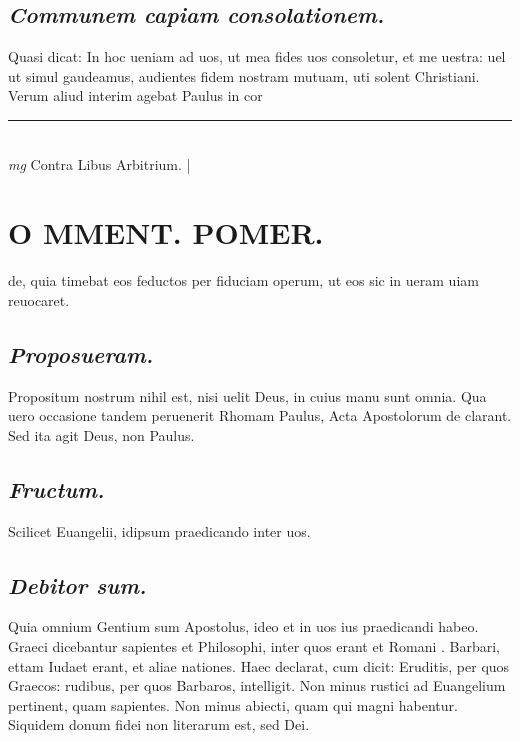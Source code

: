 \documentclass{article}
\begin{document}
\begin{pages}
\subsection*{\textit{Communem capiam consolationem. }}\pstart Quasi dicat: In hoc ueniam ad uos, ut mea fides uos consoletur, et me uestra: uel ut simul gaudeamus, audientes fidem nostram mutuam, uti solent Christiani. Verum aliud interim agebat Paulus in cor\pend
\vspace{0.5cm}\noindent
\vspace{0.2cm}\rule{1cm}{0.2pt}\\ 
\hspace{0.2cm}\textit{mg}
\footnotesize Contra Libus  Arbitrium. 
\normalsize| 
\section*{O MMENT. POMER.  }
\marginpar{[ p.tur. ]}\pstart de, quia timebat eos feductos per fiduciam operum, ut eos sic in ueram uiam reuocaret.   \pend
{}
{}
\subsection*{\textit{Proposueram. }}\pstart Propositum nostrum nihil est, nisi uelit Deus, in cuius manu sunt omnia. Qua uero occasione tandem peruenerit Rhomam Paulus, Acta Apostolorum de clarant. Sed ita agit Deus, non Paulus.   \pend
{}
{}
\subsection*{\textit{Fructum. }}\pstart Scilicet Euangelii, idipsum praedicando inter uos.  \pend
{}
{}
\subsection*{\textit{Debitor sum. }}\pstart Quia omnium Gentium sum Apostolus, ideo et in uos ius praedicandi habeo. Graeci dicebantur sapientes et Philosophi, inter quos erant et Romani . Barbari, ettam Iudaet erant, et aliae nationes. Haec declarat, cum dicit: Eruditis, per quos Graecos: rudibus, per quos Barbaros, intelligit. Non minus rustici ad Euangelium pertinent, quam sapientes. Non minus abiecti, quam qui magni habentur. Siquidem donum fidei non literarum est, sed Dei.   \pend
{}
{}

\end{pages}
\end{document}
